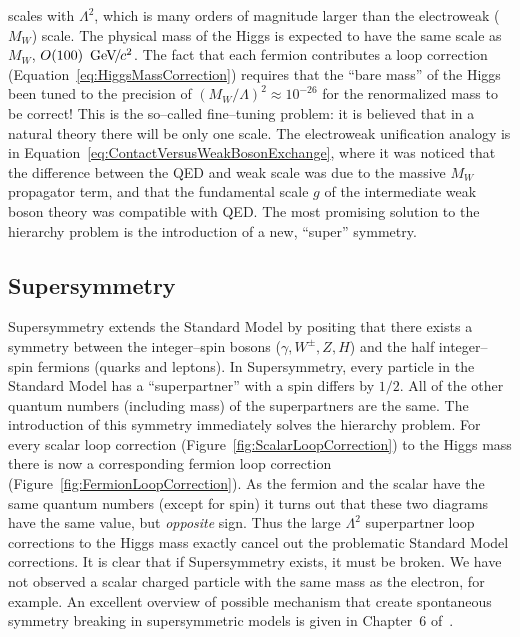 scales with $\Lambda^2$, which is many orders of magnitude larger than the
electroweak ($M_W$) scale.  The physical mass of the Higgs is expected to have
the same scale as $M_W$, $O(100)~{\,\text{Ge\hspace{-.08em}V\hspace{-0.16em}/\hspace{-0.08em}}c^\text{2}}$.  The fact that each fermion
contributes a loop correction (Equation~\ref{eq:HiggsMassCorrection}) requires
that the ``bare mass'' of the Higgs been tuned to the precision of
$(M_W/\Lambda)^2 \approx 10^{-26}$ for the renormalized mass to be correct!
This is the so--called fine--tuning problem: it is believed that in a natural
theory there will be only one scale.  The electroweak unification analogy is in
Equation~\ref{eq:ContactVersusWeakBosonExchange}, where it was noticed that the
difference between the QED and weak scale was due to the massive $M_W$
propagator term, and that the fundamental scale $g$ of the intermediate weak
boson theory was compatible with QED\@.  The most promising solution to the
hierarchy problem is the introduction of a new, ``super'' symmetry.

\subsection{Supersymmetry}
Supersymmetry extends the Standard Model by positing that there exists a
symmetry between the integer--spin bosons ($\gamma, W^\pm, Z, H$) and the half
integer--spin fermions (quarks and leptons).  In Supersymmetry, every particle
in the Standard Model has a ``superpartner'' with a spin differs by $1/2$.  All
of the other quantum numbers (including mass) of the superpartners are the same.
The introduction of this symmetry immediately solves the hierarchy problem.  For
every scalar loop correction (Figure~\ref{fig:ScalarLoopCorrection}) to the
Higgs mass there is now a corresponding fermion loop correction
(Figure~\ref{fig:FermionLoopCorrection}).  As the fermion and the scalar have
the same quantum numbers (except for spin) it turns out that these two diagrams
have the same value, but \emph{opposite} sign.  Thus the large $\Lambda^2$
superpartner loop corrections to the Higgs mass exactly cancel out the
problematic Standard Model corrections.  It is clear that if Supersymmetry
exists, it must be broken.  We have not observed a scalar charged particle with
the same mass as the electron, for example.  An excellent overview of possible
mechanism that create spontaneous symmetry breaking in supersymmetric models is
given in Chapter~6 of~\cite{Martin:1997um}.

